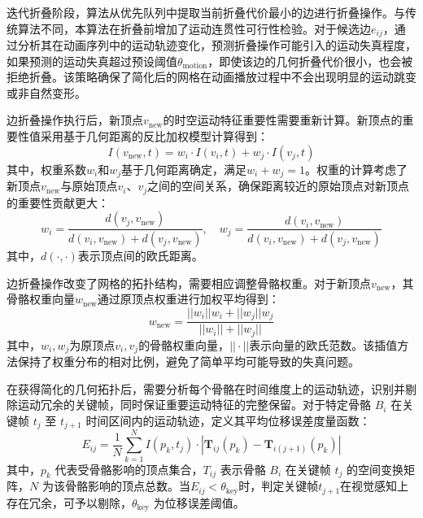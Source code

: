 迭代折叠阶段，算法从优先队列中提取当前折叠代价最小的边进行折叠操作。与传统算法不同，本算法在折叠前增加了运动连贯性可行性检验。对于候选边$e_{ij}$，通过分析其在动画序列中的运动轨迹变化，预测折叠操作可能引入的运动失真程度，如果预测的运动失真超过预设阈值$\theta_{\text{motion}}$，即使该边的几何折叠代价很小，也会被拒绝折叠。该策略确保了简化后的网格在动画播放过程中不会出现明显的运动跳变或非自然变形。

边折叠操作执行后，新顶点$v_{\text{new}}$的时空运动特征重要性需要重新计算。新顶点的重要性值采用基于几何距离的反比加权模型计算得到：
\begin{equation}
I(v_{\text{new}}, t) = w_i \cdot I(v_i, t) + w_j \cdot I(v_j, t)
\label{eq:weighted_average_importance}
\end{equation}
其中，权重系数$w_i$和$w_j$基于几何距离确定，满足$w_i + w_j = 1$。权重的计算考虑了新顶点$v_{\text{new}}$与原始顶点$v_i$、$v_j$之间的空间关系，确保距离较近的原始顶点对新顶点的重要性贡献更大：
\begin{equation}
w_i = \frac{d(v_j, v_{\text{new}})}{d(v_i, v_{\text{new}}) + d(v_j, v_{\text{new}})}, \quad
w_j = \frac{d(v_i, v_{\text{new}})}{d(v_i, v_{\text{new}}) + d(v_j, v_{\text{new}})}
\label{eq:distance_based_weights}
\end{equation}
其中，$d(\cdot,\cdot)$表示顶点间的欧氏距离。

边折叠操作改变了网格的拓扑结构，需要相应调整骨骼权重。对于新顶点$v_{\text{new}}$，其骨骼权重向量$w_{\text{new}}$通过原顶点权重进行加权平均得到：
\begin{equation}
w_{\text{new}} = \frac{||w_i|| w_i + ||w_j|| w_j}{||w_i|| + ||w_j||}
\label{eq:bone_weight}
\end{equation}
其中，$w_i, w_j$为原顶点$v_i, v_j$的骨骼权重向量，$||\cdot||$表示向量的欧氏范数。该插值方法保持了权重分布的相对比例，避免了简单平均可能导致的失真问题。

在获得简化的几何拓扑后，需要分析每个骨骼在时间维度上的运动轨迹，识别并剔除运动冗余的关键帧，同时保证重要运动特征的完整保留。对于特定骨骼 \( B_i \) 在关键帧 \( t_j \) 至 \( t_{j+1} \) 时间区间内的运动轨迹，定义其平均位移误差度量函数：
\begin{equation}
E_{ij} = \frac{1}{N} \sum_{k=1}^{N} I(p_k,t_j) \cdot \left| \mathbf{T}_{ij}(p_k) - \mathbf{T}_{i(j+1)}(p_k) \right|
\label{eq:motion_weighted_error2}
\end{equation}
其中，\( p_k \) 代表受骨骼影响的顶点集合，\( T_{ij} \) 表示骨骼 \( B_i \) 在关键帧 \( t_j \) 的空间变换矩阵，\( N \) 为该骨骼影响的顶点总数。当$E_{ij} < \theta_{\text{key}}$时，判定关键帧$t_{j+1}$在视觉感知上存在冗余，可予以剔除，$\theta_{\text{key}}$ 为位移误差阈值。

